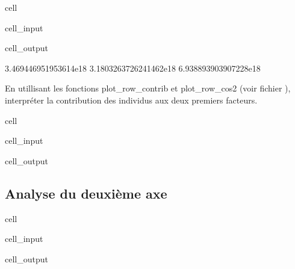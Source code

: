 \documentclass[letterpaper,10pt,french]{sphinxmanual}
\begin{document}
\begin{sphinxuseclass}{cell}
\begin{sphinxuseclass}{cell_input}
\begin{sphinxVerbatim}[commandchars=\\\{\}]
\end{sphinxVerbatim}

\end{sphinxuseclass}
\begin{sphinxuseclass}{cell_output}
\begin{sphinxVerbatim}[commandchars=\\\{\}]
3.469446951953614e\PYGZhy{}18
\PYGZhy{}3.1803263726241462e\PYGZhy{}18
\PYGZhy{}6.938893903907228e\PYGZhy{}18
\end{sphinxVerbatim}

\end{sphinxuseclass}
\end{sphinxuseclass}
\sphinxAtStartPar
En utillisant les fonctions plot\_row\_contrib et plot\_row\_cos2 (voir fichier ), interpréter la contribution des individus aux deux premiers facteurs.

\begin{sphinxuseclass}{cell}
\begin{sphinxuseclass}{cell_input}
\begin{sphinxVerbatim}[commandchars=\\\{\}]
\end{sphinxVerbatim}

\end{sphinxuseclass}
\begin{sphinxuseclass}{cell_output}
\noindent{}

\noindent{}

\end{sphinxuseclass}
\end{sphinxuseclass}

\subsection{Analyse du deuxième axe}
\label{\detokenize{TP3_AFC_ACM:analyse-du-deuxieme-axe}}
\begin{sphinxuseclass}{cell}
\begin{sphinxuseclass}{cell_input}
\begin{sphinxVerbatim}[commandchars=\\\{\}]
\end{sphinxVerbatim}

\end{sphinxuseclass}
\begin{sphinxuseclass}{cell_output}
\noindent{}

\noindent{}

\end{sphinxuseclass}
\end{sphinxuseclass}
\sphinxstepscope
\end{document}
